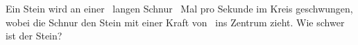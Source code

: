 Ein Stein wird an einer \rStO\ langen Schnur \nStO~Mal pro Sekunde im Kreis geschwungen, wobei die Schnur den Stein mit einer Kraft von \FStO\ ins Zentrum zieht. Wie schwer ist der Stein?
